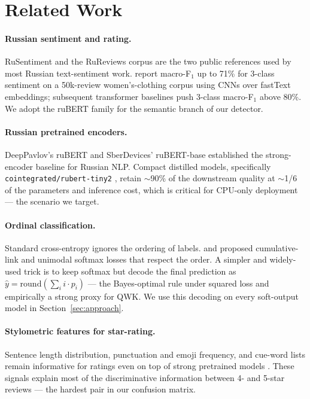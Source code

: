 \documentclass[11pt]{article}
\begin{document}
\section{Related Work}
\label{sec:related}

\paragraph{Russian sentiment and rating.}
RuSentiment \citep{rogers2018rusentiment} and the RuReviews corpus
\citep{smetanin2019rureviews} are the two public references used by most
Russian text-sentiment work. \citet{smetanin2019rureviews} report macro-F$_1$
up to 71\% for 3-class sentiment on a 50k-review women's-clothing corpus using
CNNs over fastText embeddings; subsequent transformer baselines
\citep{kuratov2019rubert,zmitrovich2023family} push 3-class macro-F$_1$ above
80\%. We adopt the ruBERT family for the semantic branch of our detector.

\paragraph{Russian pretrained encoders.}
DeepPavlov's ruBERT \citep{kuratov2019rubert} and SberDevices' ruBERT-base
\citep{zmitrovich2023family} established the strong-encoder baseline for
Russian NLP. Compact distilled models,
specifically \texttt{cointegrated/rubert-tiny2}
\citep{dale2021rubert_tiny2}, retain $\sim$90\% of the downstream quality at
$\sim$1/6 of the parameters and inference cost, which is critical for
CPU-only deployment --- the scenario we target.

\paragraph{Ordinal classification.}
Standard cross-entropy ignores the ordering of labels. \citet{frank2001ordinal}
and \citet{beckham2017unimodal} proposed cumulative-link and unimodal softmax
losses that respect the order. A simpler and widely-used trick
\citep{pedregosa2017linear} is to keep softmax but decode the final
prediction as $\hat{y} = \mathrm{round}\!\left(\sum_i i \cdot p_i\right)$ ---
the Bayes-optimal rule under squared loss and empirically a strong proxy for
QWK. We use this decoding on every soft-output model in Section~\ref{sec:approach}.

\paragraph{Stylometric features for star-rating.}
Sentence length distribution, punctuation and emoji frequency, and
cue-word lists remain informative for ratings even on top of strong
pretrained models \citep{thelwall2010sentistrength}. These signals explain
most of the discriminative information between 4- and 5-star reviews --- the
hardest pair in our confusion matrix.
\end{document}
